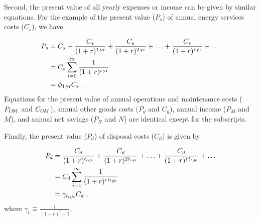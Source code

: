 Second, the present value of all yearly expenses or income
can be given by similar equations.
For the example of the present value ($P_s$)
of annual energy services costs ($C_s$),
we have

\begin{align}
\footnotesize{}
  P_s &= C_s + \frac{C_s}{(1 + r)^{1\,\mathrm{yr}}} + \frac{C_s}{(1 + r)^{2\,\mathrm{yr}}} + 
         \ldots + \frac{C_s}{(1 + r)^{i\,\mathrm{yr}}} + \ldots  \nonumber \\
      &= C_s \sum_{i = 0}^{\infty} \frac{1}{(1 + r)^{i\,\mathrm{yr}}} \nonumber \\
      &= \phi_{1\,\mathrm{yr}} C_s \; .
\end{align}
%
Equations for 
the present value of 
annual operations and maintenance costs ($P_{O\!M}$ and $C_{O\!M}$), 
annual other goods costs ($P_g$ and $C_g$), 
annual income ($P_M$ and $M$), and 
annual net savings ($P_N$ and $N$)
are identical except for the subscripts.

Finally, the present value ($P_d$) of disposal costs ($C_d$) is given by

\begin{align}
\footnotesize{}
  P_d &= \frac{C_d}{(1 + r)^{\tlife}} + \frac{C_d}{(1 + r)^{2 \tlife}} + 
         \ldots + \frac{C_d}{(1 + r)^{\itlife}} + \ldots \nonumber \\
      &= C_d \sum_{i = 1}^{\infty} \frac{1}{(1 + r)^{\itlife}} \nonumber \\
      &= \gamma_{\tlife} C_d \; ,
\end{align}
%
where 
$\gamma_t \equiv \frac{1}{(1 + r)^t - 1}$.



